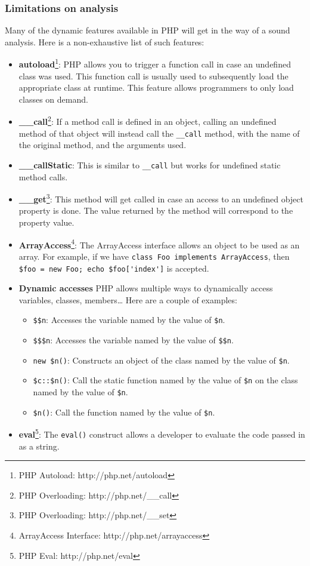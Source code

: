 \documentclass[a4paper]{article}
\begin{document}
\subsubsection{Limitations on analysis}
Many of the dynamic features available in PHP will get in the way of a sound
analysis.  Here is a non-exhaustive list of such features:
\begin{itemize}
  \item \textbf{autoload}\footnote{PHP Autoload: http://php.net/autoload}:
    PHP allows you to trigger a function call in case an undefined class was
    used.  This function call is usually used to subsequently load the
    appropriate class at runtime. This feature allows programmers to only load
    classes on demand.
  \item \textbf{\_\_call}\footnote{PHP Overloading: http://php.net/\_\_call}:
    If a method call is defined in an object, calling an undefined method of
    that object will instead call the \verb&__call& method, with the name of
    the original method, and the arguments used.
  \item \textbf{\_\_callStatic}:
    This is similar to \verb&__call& but works for undefined static method
    calls.
  \item \textbf{\_\_get}\footnote{PHP Overloading: http://php.net/\_\_set}:
    This method will get called in case an access to an undefined object
    property is done. The value returned by the method will correspond to the
    property value.
  \item \textbf{ArrayAccess}\footnote{ArrayAccess Interface: http://php.net/arrayaccess}:
    The ArrayAccess interface allows an object to be used as an array. For
    example, if we have \verb&class Foo implements ArrayAccess&, then
    \verb&$foo = new Foo; echo $foo['index']& is accepted.
  \item \textbf{Dynamic accesses}
    PHP allows multiple ways to dynamically access variables, classes, members\ldots
    Here are a couple of examples:
    \begin{itemize}
      \item \verb/$$n/:
        Accesses the variable named by the value of \verb/$n/.
      \item \verb/$$$n/:
        Accesses the variable named by the value of \verb/$$n/.
      \item \verb/new $n()/:
        Constructs an object of the class named by the value of \verb/$n/.
      \item \verb/$c::$n()/:
        Call the static function named by the value of \verb/$n/ on the class
        named by the value of \verb/$n/.
      \item \verb/$n()/:
        Call the function named by the value of \verb/$n/.
    \end{itemize}
  \item \textbf{eval}\footnote{PHP Eval: http://php.net/eval}:
    The \verb&eval()& construct allows a developer to evaluate the code passed
    in as a string.
\end{itemize}
\end{document}
